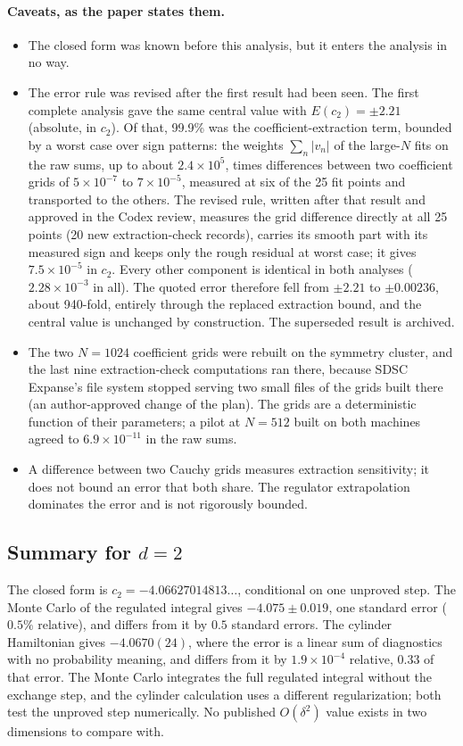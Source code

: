 \documentclass[11pt,a4paper]{article}
\numberwithin{equation}{section}
\newcommand{\sci}[2]{#1\times10^{#2}}
\begin{document}
\paragraph{Caveats, as the paper states them.}
\begin{itemize}
\item The closed form was known before this analysis, but it enters the analysis in no way.
\item The error rule was revised after the first result had been seen. The first complete analysis gave the same
 central value with $E(c_2)=\pm2.21$ (absolute, in $c_2$). Of that, 99.9\% was the coefficient-extraction term,
 bounded by a worst case over sign patterns: the weights $\sum_n|v_n|$ of the large-$N$ fits on the raw sums, up to
 about $\sci{2.4}{5}$, times differences between two coefficient grids of $\sci{5}{-7}$ to $\sci{7}{-5}$, measured at six of the 25 fit points and transported
 to the others. The revised rule, written after that result and approved in the Codex review, measures the grid
 difference directly at all 25 points (20 new extraction-check records), carries its smooth part with its measured
 sign and keeps only the rough residual at worst case; it gives $\sci{7.5}{-5}$ in $c_2$. Every other component is
 identical in both analyses ($\sci{2.28}{-3}$ in all). The quoted error therefore fell from $\pm2.21$ to $\pm0.00236$,
 about 940-fold, entirely through the replaced extraction bound, and the central value is unchanged by construction.
 The superseded result is archived.
\item The two $N=1024$ coefficient grids were rebuilt on the symmetry cluster, and the last nine extraction-check
 computations ran there, because SDSC Expanse's file system stopped serving two small files of the grids built there
 (an author-approved change of the plan). The grids are a deterministic function of their parameters; a pilot at
 $N=512$ built on both machines agreed to $\sci{6.9}{-11}$ in the raw sums.
\item A difference between two Cauchy grids measures extraction sensitivity; it does not bound an error that both
 share. The regulator extrapolation dominates the error and is not rigorously bounded.
\end{itemize}

\subsection{Summary for \texorpdfstring{$d=2$}{d=2}}
The closed form is $c_2=-4.06627014813\ldots$, conditional on one unproved step. The Monte Carlo of the regulated
integral gives $-4.075\pm0.019$, one standard error ($0.5\%$ relative), and differs from it by $0.5$ standard errors.
The cylinder Hamiltonian gives $-4.0670(24)$, where the error is a linear sum of diagnostics with no probability
meaning, and differs from it by $\sci{1.9}{-4}$ relative, 0.33 of that error. The Monte Carlo integrates the
full regulated integral without the exchange step, and the cylinder calculation uses a different regularization; both
test the unproved step numerically. No published $O(\delta^2)$ value exists in two dimensions to
compare with.
\end{document}
